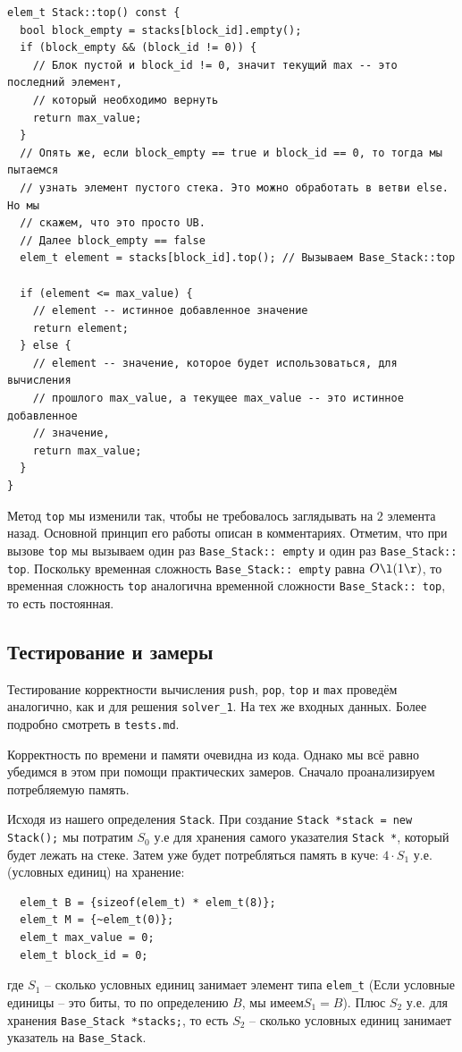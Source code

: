 \begin{verbatim}
elem_t Stack::top() const {
  bool block_empty = stacks[block_id].empty();
  if (block_empty && (block_id != 0)) {
    // Блок пустой и block_id != 0, значит текущий max -- это последний элемент,
    // который необходимо вернуть
    return max_value;
  }
  // Опять же, если block_empty == true и block_id == 0, то тогда мы пытаемся
  // узнать элемент пустого стека. Это можно обработать в ветви else. Но мы
  // скажем, что это просто UB.
  // Далее block_empty == false
  elem_t element = stacks[block_id].top(); // Вызываем Base_Stack::top

  if (element <= max_value) {
    // element -- истинное добавленное значение
    return element;
  } else {
    // element -- значение, которое будет использоваться, для вычисления
    // прошлого max_value, а текущее max_value -- это истинное добавленное
    // значение,
    return max_value;
  }
}
\end{verbatim}
Метод \texttt{top} мы изменили так, чтобы не требовалось заглядывать на \(2\) элемента назад. Основной принцип его работы описан в комментариях. Отметим, что при вызове \texttt{top} мы вызываем один раз \texttt{Base_Stack:: empty} и один раз \texttt{Base_Stack:: top}. Поскольку временная сложность \texttt{Base_Stack:: empty} равна \(O\l(1\r)\), то временная сложность \texttt{top} аналогична временной сложности \texttt{Base_Stack:: top}, то есть постоянная.


\subsection{Тестирование и замеры}

Тестирование корректности вычисления \texttt{push}, \texttt{pop}, \texttt{top} и \texttt{max} проведём аналогично, как и для решения \texttt{solver_1}. На тех же входных данных. Более подробно смотреть в \texttt{tests.md}.

Корректность по времени и памяти очевидна из кода. Однако мы всё равно убедимся в этом при помощи практических замеров. Сначало проанализируем потребляемую память. 

Исходя из нашего определения \texttt{Stack}. При создание \texttt{Stack *stack = new Stack();} мы потратим \(S_0\) у.е для хранения самого указателия \texttt{Stack *}, который будет лежать на стеке. Затем уже будет потребляться память в куче: \(4\cdot S_1\) у.е. (условных единиц) на хранение:
\begin{verbatim}
  elem_t B = {sizeof(elem_t) * elem_t(8)};
  elem_t M = {~elem_t(0)};
  elem_t max_value = 0; 
  elem_t block_id = 0;
\end{verbatim}
где \(S_1\) -- сколько условных единиц занимает элемент типа \texttt{elem_t} (Если условные единицы -- это биты, то по определению \(B\), мы имеем\(S_1 = B\)). 
Плюс \(S_2\) у.е. для хранения \texttt{Base_Stack *stacks;}, то есть \(S_2\) -- сколько условных единиц занимает указатель на \texttt{Base_Stack}.

